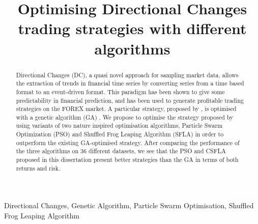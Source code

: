 \documentclass[conference]{IEEEtran}
\begin{document}
\title{Optimising Directional Changes trading strategies with different algorithms\\}

\author{
\and
{}
\and
{}
}

\maketitle

\begin{abstract}
Directional Changes (DC), a quasi novel approach for sampling market data, allows the extraction of trends in financial time series by converting series from a time based format to an event-driven format. This paradigm has been shown to give some predictability in financial prediction, and has been used to generate profitable trading strategies on the FOREX market. A particular strategy, proposed by \cite{kampouridis_otero_dc_ga}, is optimised with a genetic algorithm (GA) . We propose to optimise the strategy proposed by \cite{kampouridis_otero_dc_ga} using variants of two nature inspired optimisation algorithms, Particle Swarm Optimization (PSO) and Shuffled Frog Leaping Algorithm (SFLA) in order to outperform the existing GA-optimised strategy. After comparing the performance of the three algorithms on 36 different datasets, we see that the PSO and CSFLA proposed in this dissertation present better strategies than the GA in terms of both returns and risk.

\end{abstract}

\begin{IEEEkeywords}
Directional Changes, Genetic Algorithm, Particle Swarm Optimisation, Shuffled Frog Leaping Algorithm
\end{IEEEkeywords}
\end{document}
